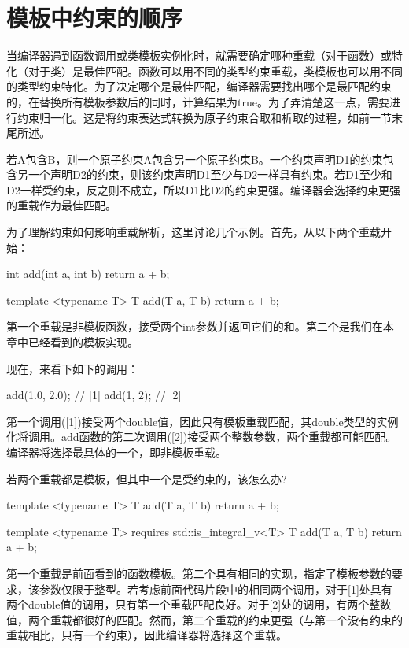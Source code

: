 \section{模板中约束的顺序}
当编译器遇到函数调用或类模板实例化时，就需要确定哪种重载（对于函数）或特化（对于类）是最佳匹配。函数可以用不同的类型约束重载，类模板也可以用不同的类型约束特化。为了决定哪个是最佳匹配，编译器需要找出哪个是最匹配约束的，在替换所有模板参数后的同时，计算结果为true。为了弄清楚这一点，需要进行约束归一化。这是将约束表达式转换为原子约束合取和析取的过程，如前一节末尾所述。

若A包含B，则一个原子约束A包含另一个原子约束B。一个约束声明D1的约束包含另一个声明D2的约束，则该约束声明D1至少与D2一样具有约束。若D1至少和D2一样受约束，反之则不成立，所以D1比D2的约束更强。编译器会选择约束更强的重载作为最佳匹配。

为了理解约束如何影响重载解析，这里讨论几个示例。首先，从以下两个重载开始：

\begin{cpp}
int add(int a, int b)
{
	return a + b;
}

template <typename T>
T add(T a, T b)
{
	return a + b;
}
\end{cpp}

第一个重载是非模板函数，接受两个int参数并返回它们的和。第二个是我们在本章中已经看到的模板实现。

现在，来看下如下的调用：

\begin{cpp}
add(1.0, 2.0); // [1]
add(1, 2); // [2]
\end{cpp}

第一个调用([1])接受两个double值，因此只有模板重载匹配，其double类型的实例化将调用。add函数的第二次调用([2])接受两个整数参数，两个重载都可能匹配。编译器将选择最具体的一个，即非模板重载。

若两个重载都是模板，但其中一个是受约束的，该怎么办?

\begin{cpp}
template <typename T>
T add(T a, T b)
{
	return a + b;
}

template <typename T>
requires std::is_integral_v<T>
T add(T a, T b)
{
	return a + b;
}
\end{cpp}

第一个重载是前面看到的函数模板。第二个具有相同的实现，指定了模板参数的要求，该参数仅限于整型。若考虑前面代码片段中的相同两个调用，对于[1]处具有两个double值的调用，只有第一个重载匹配良好。对于[2]处的调用，有两个整数值，两个重载都很好的匹配。然而，第二个重载的约束更强（与第一个没有约束的重载相比，只有一个约束），因此编译器将选择这个重载。

